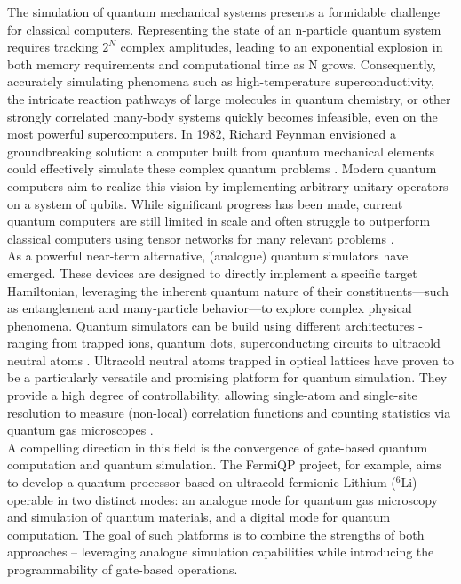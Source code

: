 The simulation of quantum mechanical systems presents a formidable challenge for classical computers. Representing the state of an n-particle quantum system requires tracking $2^N$ complex amplitudes, leading to an exponential explosion in both memory requirements and computational time as N grows. Consequently, accurately simulating phenomena such as high-temperature superconductivity, the intricate reaction pathways of large molecules in quantum chemistry, or other strongly correlated many-body systems quickly becomes infeasible, even on the most powerful supercomputers. In 1982, Richard Feynman envisioned a groundbreaking solution: a computer built from quantum mechanical elements could effectively simulate these complex quantum problems \cite{Feynman}. Modern quantum computers aim to realize this vision by implementing arbitrary unitary operators on a system of qubits. While significant progress has been made, current quantum computers are still limited in scale and often struggle to outperform classical computers using tensor networks for many relevant problems \cite{Fraxanet_2023}.\\
As a powerful near-term alternative, (analogue) quantum simulators have emerged. These devices are designed to directly implement a specific target Hamiltonian, leveraging the inherent quantum nature of their constituents—such as entanglement and many-particle behavior—to explore complex physical phenomena. Quantum simulators can be build using different architectures - ranging from trapped ions, quantum dots, superconducting circuits to ultracold neutral atoms \cite{qstext}. Ultracold neutral atoms trapped in optical lattices have proven to be a particularly versatile and promising platform for quantum simulation. They provide a high degree of controllability, allowing single-atom and single-site resolution to measure (non-local) correlation functions and counting statistics via quantum gas microscopes \cite{Bloch2012,impertro2024local}.\\
A compelling direction in this field is the convergence of gate-based quantum computation and quantum simulation. The FermiQP project, for example, aims to develop a quantum processor based on ultracold fermionic Lithium ($^6$Li) operable in two distinct modes: an analogue mode for quantum gas microscopy and simulation of quantum materials, and a digital mode for quantum computation. The goal of such platforms is to combine the strengths of both approaches – leveraging analogue simulation capabilities while introducing the programmability of gate-based operations.\\
